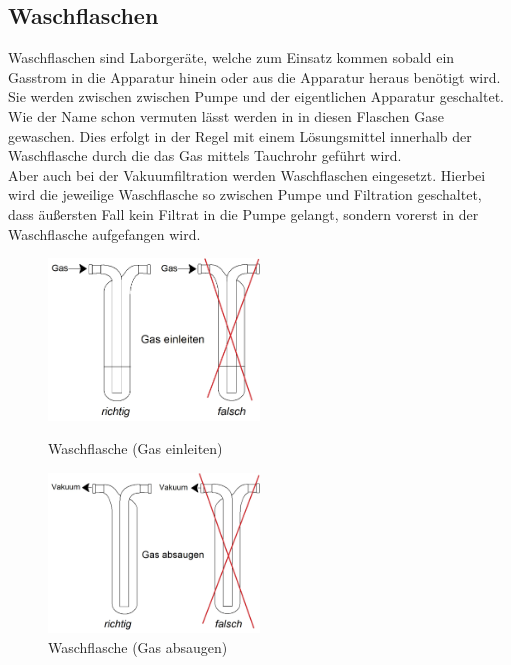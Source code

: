 \subsection{Waschflaschen}
Waschflaschen sind Laborgeräte, welche zum Einsatz kommen sobald ein Gasstrom in die Apparatur hinein oder aus die Apparatur heraus benötigt wird. Sie werden zwischen zwischen Pumpe und der eigentlichen Apparatur geschaltet. \\
Wie der Name schon vermuten lässt werden in in diesen Flaschen Gase gewaschen. Dies erfolgt in der Regel mit einem Lösungsmittel innerhalb der Waschflasche durch die das Gas mittels Tauchrohr geführt wird.\\
Aber auch bei der Vakuumfiltration werden Waschflaschen eingesetzt. Hierbei wird die jeweilige Waschflasche so zwischen Pumpe und Filtration geschaltet, dass äußersten Fall kein Filtrat in die Pumpe gelangt, sondern vorerst in der Waschflasche aufgefangen wird.

\begin{figure}[h!]
	\begin{minipage}[t]{0.49\textwidth}
		\vspace{0pt}
		\centering
		\includegraphics[width=0.5\textwidth]{img/Waschflasche (Gas einleiten).jpg}
		\caption{Waschflasche (Gas einleiten)}
		\label{fig:Waschflasche_ein}
	\end{minipage}
	\hfill
	\hspace{2mm}
	\begin{minipage}[t]{0.49\textwidth}
		\vspace{0pt}
	\centering
	\includegraphics[width=0.5\textwidth]{img/Waschflasche (Gas absaugen).jpg}
	\caption{Waschflasche (Gas absaugen)}
	\label{fig:Waschflasche_aus}
	\end{minipage}
\end{figure}
\FloatBarrier

